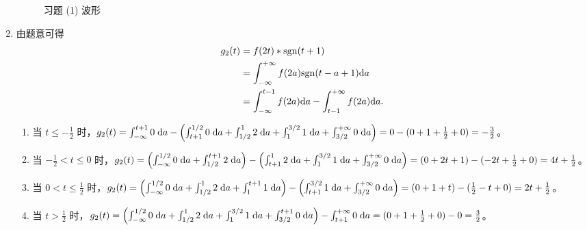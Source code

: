 \begin{solution}
\begin{enumerate}[label=(\arabic*)]
\begin{figure}[H]
                \caption{习题 \theexercise (1) 波形}
                \label{fig:chap1-exercise5-solution1}
            \end{figure}
        \item 由题意可得
            \begin{align*}
                g_2(t) & = f(2t) * \mathrm{sgn}(t + 1) \\
                & = \int_{-\infty}^{+\infty}f(2a)\mathrm{sgn}(t - a + 1)\mathrm{d}a \\
                & = \int_{-\infty}^{t - 1}f(2a)\mathrm{d}a - \int_{t - 1}^{+\infty}f(2a)\mathrm{d}a.
            \end{align*}

            \begin{enumerate}
                \item 当 $t \le -\frac{1}{2}$ 时，$g_2(t)
                    = \int_{-\infty}^{t + 1}0\;\mathrm{d}a - \left(\int_{t + 1}^{1/2}0\;\mathrm{d}a + \int_{1/2}^{1}2\;\mathrm{d}a + \int_{1}^{3/2}1\;\mathrm{d}a + \int_{3/2}^{+\infty}0\;\mathrm{d}a\right)
                    = 0 - (0 + 1 + \frac{1}{2} + 0)
                    = -\frac{3}{2}$。
                \item 当 $-\frac{1}{2} < t \le 0$ 时，$g_2(t)
                    = \left(\int_{-\infty}^{1/2}0\;\mathrm{d}a + \int_{1/2}^{t + 1}2\;\mathrm{d}a\right) - \left(\int_{t + 1}^{1}2\;\mathrm{d}a + \int_{1}^{3/2}1\;\mathrm{d}a + \int_{3/2}^{+\infty}0\;\mathrm{d}a\right)
                    = (0 + 2t + 1) - (-2t + \frac{1}{2} + 0)
                    = 4t + \frac{1}{2}$。
                \item 当 $0 < t \le \frac{1}{2}$ 时，$g_2(t)
                    = \left(\int_{-\infty}^{1/2}0\;\mathrm{d}a + \int_{1/2}^{1}2\;\mathrm{d}a + \int_{1}^{t + 1}1\;\mathrm{d}a\right) - \left(\int_{t + 1}^{3/2}1\;\mathrm{d}a + \int_{3/2}^{+\infty}0\;\mathrm{d}a\right)
                    = (0 + 1 + t) - (\frac{1}{2} - t + 0)
                    = 2t + \frac{1}{2}$。
                \item 当 $t > \frac{1}{2}$ 时，$g_2(t)
                    = \left(\int_{-\infty}^{1/2}0\;\mathrm{d}a + \int_{1/2}^{1}2\;\mathrm{d}a + \int_{1}^{3/2}1\;\mathrm{d}a + \int_{3/2}^{t + 1}0\;\mathrm{d}a\right) - \int_{t + 1}^{+\infty}0\;\mathrm{d}a
                    = (0 + 1 + \frac{1}{2} + 0) - 0
                    = \frac{3}{2}$。
            \end{enumerate}


\end{enumerate}
\end{solution}
